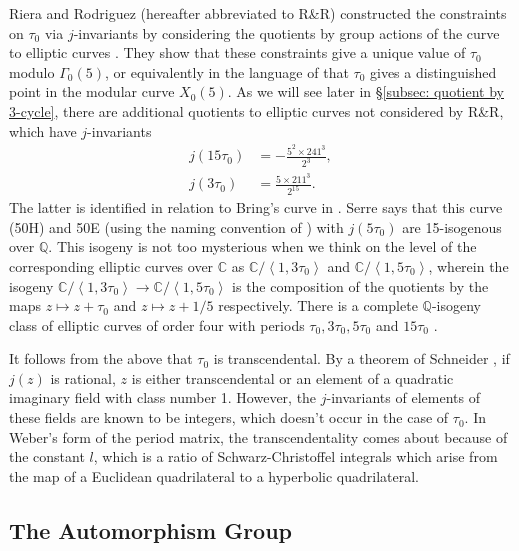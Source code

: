 \documentclass{amsart}
\newcommand{\pangle}[1]{\left\langle #1 \right\rangle}
\begin{document}
Riera and Rodriguez (hereafter abbreviated to R\&R) constructed the constraints on $\tau_0$ via $j$-invariants by considering the quotients by group actions of the curve to elliptic curves \cite{Riera1992}. They show that these constraints give a unique value of $\tau_0$ modulo $\Gamma_0(5)$, or equivalently in the language of \cite{Gonzalez2000} that $\tau_0$ gives a distinguished point in the modular curve $X_0(5)$. As we will see later in \S\ref{subsec: quotient by 3-cycle}, there are additional quotients to elliptic curves not considered by  R\&R, which have $j$-invariants 
\begin{align}
    j(15 \tau_0) &= -\frac{5^2 \times 241^3}{2^3}  , \\
    j(3 \tau_0) &= \frac{5 \times 211^3}{2^{15}}   .
\end{align}
The latter is identified in relation to Bring's curve in \cite[Exercise 8.3.2c]{Serre2008}. Serre says that this curve (50H) and 50E (using the naming convention of \cite{Birch1975}) with $j(5\tau_0)$ are 15-isogenous over $\mathbb{Q}$. This isogeny is not too mysterious when we think on the level of the corresponding elliptic curves over $\mathbb{C}$ as $\mathbb{C}/\pangle{1,3 \tau_0}$ and $\mathbb{C}/\pangle{1,5 \tau_0}$, wherein the isogeny $\mathbb{C}/\pangle{1,3 \tau_0} \to \mathbb{C}/\pangle{1,5 \tau_0}$ is the composition of the quotients by the maps $z \mapsto z+\tau_0$ and $z \mapsto z+ 1/5$ respectively. There is a complete $\mathbb{Q}$-isogeny class of elliptic curves of order four with periods $\tau_0, 3 \tau_0, 5 \tau_0$ and $15 \tau_0$ \cite{Birch1975}. 

It follows from the above that $\tau_0$ is transcendental. By a theorem of Schneider \cite{Baker2008}, if $j(z)$ is rational, $z$ is either transcendental or an element of a quadratic imaginary field with class number 1. However, the $j$-invariants of elements of these fields are known to be integers, which doesn't occur in the case of $\tau_0$. In Weber's form of the period matrix, the transcendentality comes about because of the constant $l$, which is a ratio of Schwarz-Christoffel integrals which arise from the map of a Euclidean quadrilateral to a hyperbolic quadrilateral. 
\subsection{The Automorphism Group}\label{subsec: automorphism group}
\end{document}

